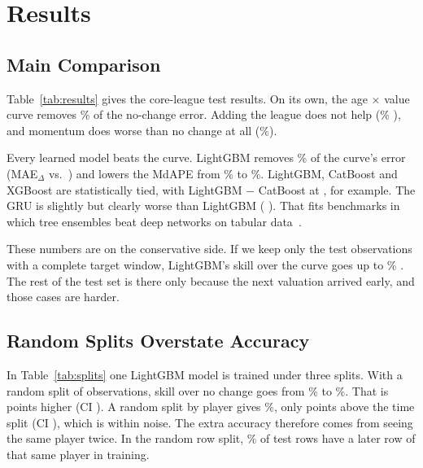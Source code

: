 \documentclass[conference]{IEEEtran}
\begin{document}
\section{Results}



\subsection{Main Comparison}
Table~\ref{tab:results} gives the core-league test results. On its own, the age $\times$ value curve removes \SkillCurve\% \SkillCurveCI{} of the no-change error. Adding the league does not help (\VsCurveLeagueCurve\% \VsCurveLeagueCurveCI), and momentum does worse than no change at all (\SkillMomentum\%).

Every learned model beats the curve. LightGBM removes \VsCurveLGB\% \VsCurveLGBCI{} of the curve's error (MAE$_\Delta$ \MAELGB{} vs.\ \MAECurve) and lowers the MdAPE from \MdAPECurve\% to \MdAPELGB\%. LightGBM, CatBoost and XGBoost are statistically tied, with LightGBM $-$ CatBoost at \DiffLGBCat{} \DiffLGBCatCI, for example. The GRU is slightly but clearly worse than LightGBM (\DiffLGBGRU{} \DiffLGBGRUCI). That fits benchmarks in which tree ensembles beat deep networks on tabular data~\cite{grinsztajn2022why,shwartzziv2022tabular}.

These numbers are on the conservative side. If we keep only the \FullWinRows{} test observations with a complete target window, LightGBM's skill over the curve goes up to \FullWinVsCurve\% \FullWinVsCurveCI. The rest of the test set is there only because the next valuation arrived early, and those cases are harder.

\subsection{Random Splits Overstate Accuracy}
In Table~\ref{tab:splits} one LightGBM model is trained under three splits. With a random split of observations, skill over no change goes from \SplitSkillTime\% to \SplitSkillRows\%. That is \SplitDiffRowsTime{} points higher (CI \SplitDiffRowsTimeCI). A random split by player gives \SplitSkillPlayers\%, only \SplitDiffPlayersTime{} points above the time split (CI \SplitDiffPlayersTimeCI), which is within noise. The extra accuracy therefore comes from seeing the same player twice. In the random row split, \LeakLater\% of test rows have a later row of that same player in training.
\end{document}
